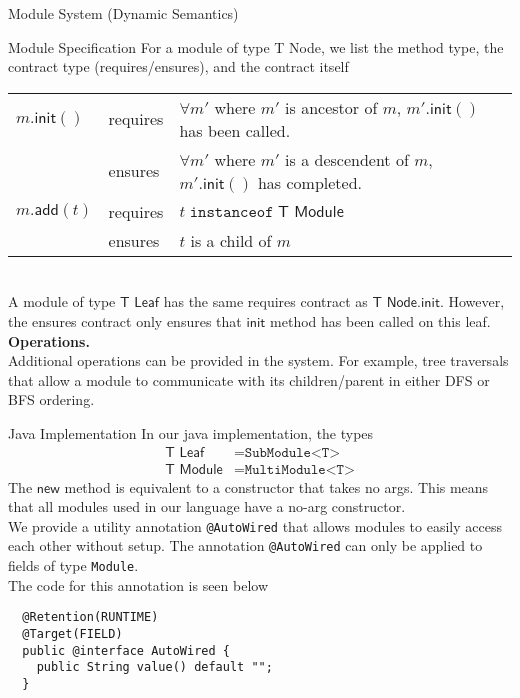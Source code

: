 \documentclass[11pt]{article}
\begin{document}
\begin{section}{Module System (Dynamic Semantics)}
\begin{subsection}{Module Specification}
For a module of type \textsf{T Node}, we list the method type, the contract type (requires/ensures), and the contract itself\\

\begin{tabularx}{\linewidth}{l l X}
$m.\textsf{init}()$ & requires & $\forall m'$ where $m'$ is ancestor of $m$, $m'.\textsf{init}()$ has been called. \\
& ensures & $\forall m'$ where $m'$ is a descendent of $m$, $m'.\textsf{init}()$ has completed.\\
$m.\textsf{add}(t)$ & requires & $t\;\texttt{instanceof}\;\textsf{T Module}$\\
& ensures & $t$ is a child of $m$
\end{tabularx}\\

A module of type $\textsf{T Leaf}$ has the same requires contract as $\textsf{T Node.init}$. However, the ensures contract only ensures that $\textsf{init}$ method has been called on this leaf.\\

\textbf{Operations.}\medskip\\
Additional operations can be provided in the system. For example, tree traversals that allow a module to communicate with its children/parent in either DFS or BFS ordering. 
\end{subsection}
\begin{subsection}{Java Implementation}
In our java implementation, the types
\begin{align*}
\textsf{T Leaf} &= \texttt{SubModule<T>}\\
\textsf{T Module} &= \texttt{MultiModule<T>}
\end{align*}
The $\textsf{new}$ method is equivalent to a constructor that takes no args. This means that all modules used in our language have a no-arg constructor.\\

We provide a utility annotation \verb|@AutoWired| that allows modules to easily access each other without 
setup. The annotation \verb|@AutoWired| can only be applied to fields of type \verb|Module|.\\

The code for this annotation is seen below
\begin{verbatim}
  @Retention(RUNTIME)
  @Target(FIELD)
  public @interface AutoWired {
    public String value() default "";
  }
\end{verbatim}


\end{subsection}
\end{section}
\end{document}

